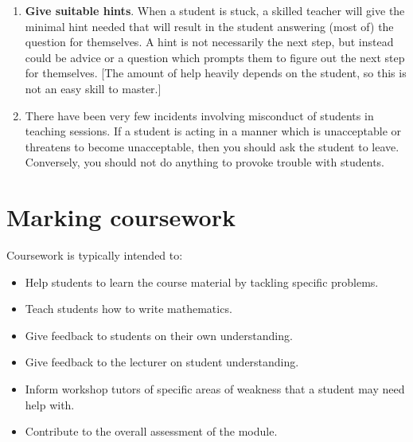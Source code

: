 \documentclass[11pt,a4paper]{amsart}
\begin{document}
\begin{enumerate}
\item {\bf Give suitable hints}. When a student is stuck, a skilled teacher will give the minimal hint needed that will result in the student answering (most of) the question for themselves. A hint is not necessarily the next step, but instead could be advice or a question which prompts them to figure out the next step for themselves. [The amount of help heavily depends on the student, so this is not an easy skill to master.]
\item There have been very few incidents involving misconduct of students in teaching sessions. If a student is acting in a manner which is unacceptable or threatens to become unacceptable, then you should ask the student to leave. Conversely, you should not do anything to provoke trouble with students.
\end{enumerate}
 \newpage
\section{Marking coursework}

Coursework is typically intended to:
\begin{itemize}
\item Help students to learn the course material by tackling specific problems.
\item Teach students how to write mathematics. 
\item Give feedback to students on their own understanding.
\item Give feedback to the lecturer on student understanding.
\item Inform workshop tutors of specific areas of weakness that a student may need help with.
\item Contribute to the overall assessment of the module.
\end{itemize}
\end{document}
